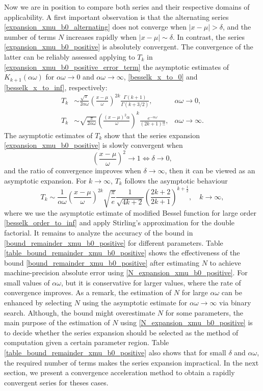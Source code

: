 \documentclass[10pt,a4paper,oneside]{article}
\numberwithin{equation}{section}
\begin{document}
Now we are in position to compare both series and their respective domains of applicability. A first important observation is that the alternating series \eqref{expansion_xmu_b0_alternating} does not converge when $|x - \mu| > \delta$, and the number of terms $N$ increases rapidly when $|x - \mu| \sim \delta$. In contrast, the series \eqref{expansion_xmu_b0_positive} is absolutely convergent. The convergence of the latter can be reliably assessed applying to $T_k$ in \eqref{expansion_xmu_b0_positive_error_term} the asymptotic estimates of $K_{k+1}(\alpha\omega)$ for $\alpha \omega \to 0$ and $\alpha \omega \to \infty$, \eqref{besselk_x_to_0} and \eqref{besselk_x_to_inf}, respectively:
\begin{align*}
T_k &\sim \frac{\sqrt{\pi}}{2\alpha\omega} \left(\frac{x-\mu}{\omega}\right)^{2k}\frac{\Gamma(k + 1)}{\Gamma(k + 3/2)}, & \alpha\omega \to 0,\\
T_k &\sim \sqrt{\frac{\pi}{2\alpha \omega}} \left(\frac{(x-\mu)^2\alpha}{\omega}\right)^k \frac{e^{-\alpha \omega}}{(2k + 1)!!}, &\alpha\omega \to \infty.
\end{align*}
The asymptotic estimates of $T_k$ show that the series expansion \eqref{expansion_xmu_b0_positive} is slowly convergent when
\begin{equation*}
\left(\frac{x-\mu}{\omega}\right)^2 \to 1 \Longleftrightarrow \delta \to 0,
\end{equation*}
and the ratio of convergence improves when $\delta \to \infty$, then it can be viewed as an asymptotic expansion. For $k \to \infty$, $T_k$ follows the asymptotic behaviour
\begin{equation*}
T_k \sim \frac{1}{\alpha\omega}\left(\frac{x-\mu}{\omega}\right)^{2k}\sqrt{\frac{\pi}{e}}\frac{1}{\sqrt{4k + 2}}\left(\frac{2k + 2}{2k + 1}\right)^{k + \frac{1}{2}}, \quad k \to \infty,
\end{equation*}
where we use the asymptotic estimate of modified Bessel function for large order \eqref{besselk_order_to_inf} and apply Stirling's approximation for the double factorial. It remains to analyze the accuracy of the bound in \eqref{bound_remainder_xmu_b0_positive} for different parameters. Table \ref{table_bound_remainder_xmu_b0_positive} shows the effectiveness of the bound \eqref{bound_remainder_xmu_b0_positive} after estimating $N$ to achieve machine-precision absolute error using \eqref{N_expansion_xmu_b0_positive}. For small values of $\alpha\omega$, but it is conservative for larger values, where the rate of convergence improves. As a remark, the estimation of $N$ for large $\alpha\omega$ can be enhanced by selecting $N$ using the asymptotic estimate for $\alpha\omega \to \infty$ via binary search. Although, the bound might overestimate $N$ for some parameters, the main purpose of the estimation of $N$ using \eqref{N_expansion_xmu_b0_positive} is to decide whether the series expansion should be selected as the method of computation given a certain parameter region. Table \ref{table_bound_remainder_xmu_b0_positive} also shows that for small $\delta$ and $\alpha\omega$, the required number of terms makes the series expansion impractical. In the next section, we present a convergence acceleration method to obtain a rapidly convergent series for theses cases.
\end{document}
